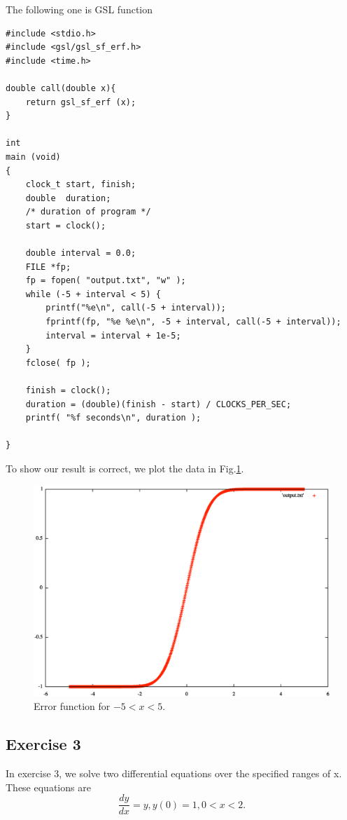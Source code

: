 \documentclass{article}
\begin{document}
The following one is GSL function
\begin{lstlisting}
#include <stdio.h>
#include <gsl/gsl_sf_erf.h>
#include <time.h>

double call(double x){
    return gsl_sf_erf (x);
}

int
main (void)
{
    clock_t start, finish;
    double  duration;
    /* duration of program */
    start = clock();
    
    double interval = 0.0;
    FILE *fp;
    fp = fopen( "output.txt", "w" );
    while (-5 + interval < 5) {
        printf("%e\n", call(-5 + interval));
        fprintf(fp, "%e %e\n", -5 + interval, call(-5 + interval));
        interval = interval + 1e-5;
    }
    fclose( fp );
    
    finish = clock();
    duration = (double)(finish - start) / CLOCKS_PER_SEC;
    printf( "%f seconds\n", duration );
    
}
\end{lstlisting}
To show our result is correct, we plot the data in Fig.\ref{fig0}.
\begin{figure}
    \centering
    \includegraphics[width=4.7in]{errorfunction.eps}
    \caption{Error function for $-5 < x < 5$.}
    \label{fig0}
\end{figure}


\subsection{Exercise 3}

In exercise 3, we solve two differential equations over the specified ranges of x. These equations are
\begin{equation}\label{e1}
\frac{dy}{dx} = y, y(0) = 1, 0 < x < 2.
\end{equation}
\end{document}

